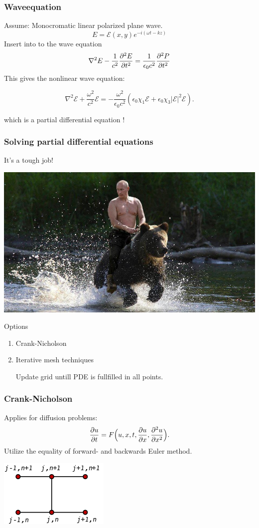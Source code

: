 \begin{frame}
  \frametitle{Waveequation}
  Assume: Monocromatic linear polarized plane wave.
  \[E = \mathcal{E}(x,y) e^{-i (\omega t-kz)}\]
  Insert into to the wave equation
  \[  \nabla^2 E - \frac{1}{c^2} \frac{\partial^2 E}{\partial t^2}
  = \frac{1}{\epsilon_0c^2} \frac{\partial^2 P}{\partial t^2}\]
  This gives the nonlinear wave equation:

  \[\nabla^2 \mathcal{E} + \frac{\omega^{2}}{c^2} \mathcal{E} = - \frac{\omega^2}{\epsilon_0 c^2} \left( \epsilon_0 \chi_1
    \mathcal{E} + \epsilon_0 \chi_3 |\mathcal{E}|^2 \mathcal{E}
  \right).\]

  which is a partial differential equation !
\end{frame}

\begin{frame}
  \frametitle{Solving partial differential equations}
  It's a tough job!

  \includegraphics[width=\columnwidth]{putin}
\end{frame}

\begin{frame}{Options}
\begin{enumerate}
\item Crank-Nicholson
\item Iterative mesh techniques

  Update grid untill PDE is fullfilled in all points. 
\end{enumerate}
\end{frame}


\begin{frame}
  \frametitle{Crank-Nicholson}
  Applies for diffusion problems:
  \[  \frac{\partial u}{\partial t} = F \Big(u, x, t, \frac{\partial u}{\partial x}, \frac{\partial^2 u}{\partial x^2} \Big). \]
  Utilize the equality of forward- and backwards Euler method.
  \begin{center}
    \includegraphics[width=0.4\columnwidth]{Crank}
  \end{center}
\end{frame}

